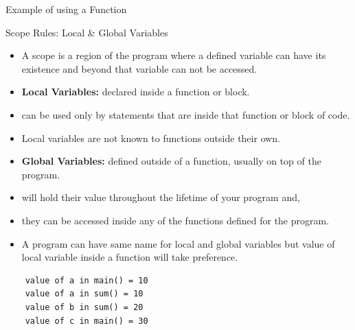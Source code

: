 \documentclass[10pt,t]{beamer}
\begin{document}
\begin{frame}{Example of using a Function}
  
\end{frame}

\begin{frame}{Scope Rules: Local \& Global Variables}
  \begin{itemize}
  \item A scope is a region of the program where a defined variable can have its existence and beyond that variable can not be accessed.
  \item \textbf{\color{lublue}Local Variables:} declared inside a function or block.
  \item[] can be used only by statements that are inside that function or block of code.
  \item[] Local variables are not known to functions outside their own.
  \item \textbf{\color{lublue}Global Variables:}  defined outside of a function, usually on top of the program.
  \item[] will hold their value throughout the lifetime of your program and,
  \item[] they can be accessed inside any of the functions defined for the program.
  \item A program can have same name for local and global variables but value of local variable inside a function will take preference.
  \end{itemize}
  
  \begin{lstlisting}
    value of a in main() = 10
    value of a in sum() = 10
    value of b in sum() = 20
    value of c in main() = 30
  \end{lstlisting}
\end{frame}
\end{document}
